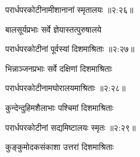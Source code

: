 {\devanagarifont परार्धपरकोटीनामीशानानां स्मृतालयः {॥२:२६॥} \veg\dontdisplaylinenum }%

{\devanagarifont बालसूर्यप्रभाः सर्वे ज्ञेयास्तत्पुरुषालये \thinspace{\dandab} \dontdisplaylinenum }%


{\devanagarifont परार्धपरकोटीनां पूर्वस्यां दिशमाश्रिताः {॥२:२७॥} \veg\dontdisplaylinenum }%

{\devanagarifont भिन्नाञ्जनप्रभाः सर्वे दक्षिणां दिशमाश्रिताः \thinspace{\dandab} \dontdisplaylinenum }%


{\devanagarifont परार्धपरकोटीनामघोरालयमाश्रिताः {॥२:२८॥} \veg\dontdisplaylinenum }%

{\devanagarifont कुन्देन्दुहिमशैलाभाः पश्चिमां दिशमाश्रिताः \thinspace{\dandab} \dontdisplaylinenum }%


{\devanagarifont परार्धपरकोटीनां सद्यमिष्टालयः स्मृतः {॥२:२९॥} \veg\dontdisplaylinenum }%

{\devanagarifont कुङ्कुमोदकसंकाशा उत्तरां दिशमाश्रिताः \thinspace{\dandab} \dontdisplaylinenum }%

